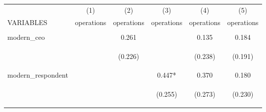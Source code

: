 \begin{center}
\begin{tabular}{lccccc} \hline
 & (1) & (2) & (3) & (4) & (5) \\
VARIABLES & operations & operations & operations & operations & operations \\ \hline
\vspace{4pt} & \begin{footnotesize}\end{footnotesize} & \begin{footnotesize}\end{footnotesize} & \begin{footnotesize}\end{footnotesize} & \begin{footnotesize}\end{footnotesize} & \begin{footnotesize}\end{footnotesize} \\
modern\_ceo &  & 0.261 &  & 0.135 & 0.184 \\
\vspace{4pt} & \begin{footnotesize}\end{footnotesize} & \begin{footnotesize}(0.226)\end{footnotesize} & \begin{footnotesize}\end{footnotesize} & \begin{footnotesize}(0.238)\end{footnotesize} & \begin{footnotesize}(0.191)\end{footnotesize} \\
modern\_respondent &  &  & 0.447* & 0.370 & 0.180 \\
\vspace{4pt} & \begin{footnotesize}\end{footnotesize} & \begin{footnotesize}\end{footnotesize} & \begin{footnotesize}(0.255)\end{footnotesize} & \begin{footnotesize}(0.273)\end{footnotesize} & \begin{footnotesize}(0.230)\end{footnotesize} \\

\end{tabular}
\end{center}
